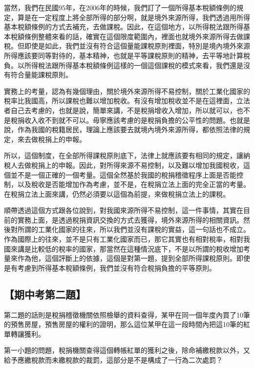 \documentclass[oneside,sub3section]{ctexbook}
\begin{document}
當然，我們在民國95年，在2006年的時候，我們訂了一個所得基本稅額條例的規定，算是在一定程度上將全部所得的部分啊，就是境外來源所得，我們透過用所得基本稅額條例的方式去補充，去做課稅。因此，在這個地方，以所得稅法跟所得基本稅額條例整體來看的話，確實在這個限度範圍內，裡面也就境外來源所得去做課稅。但即使是如此，我們並沒有符合這個量能課稅原則裡面，特別是境內境外來源所得應該要同等對待的，基本精神，也就是平等課稅原則的精神，去平等地計算稅負。以所得稅法跟所得基本稅額條例這樣的一個這個課稅的模式來看，我們還是沒有符合量能課稅原則。

實務上的考量，認為有幾個理由，關於境外來源所得不易控制，關於工業化國家的稅率比我國高，所以課稅也難以增加稅收。有沒有增加稅收並不是在這裡面，立法者自己去考慮的，也就是說，簡單來講，不是稅捐增收入增加，所以就可以，也不是稅捐收入收不到就不可以。毋寧應該考慮的是稅捐負擔的公平性的問題。也就是說，作為我國的稅籍居民，理論上應該要去就境內境外來源所得，都依照法律的規定，來去做稅捐上的申報。

所以，這個制度，在全部所得課稅原則底下，法律上就應該要有相同的規定，讓納稅人去做稅捐上的申報。因此，對所得來源不易控制，以及難以增加我國稅收，這個並不是一個正確的一個考量。這個全然基於我國的稅捐稽徵程序上面是否能控制，以及稅收是否能增加作為考慮，並不是，在稅捐立法上面的完全正當的考量。在稅捐立法上面來講，仍然必須要以這個為前提，來做稅捐立法上的課稅。

順帶透過這個方式跟各位說到，對我國來源所得不易控制，這一件事情，其實在目前的實務上面，是透過稅捐資訊交換的方式去獲得，境外來源所得的相關資訊。然後對所謂的工業化國家的往來，所以我們並沒有課稅的實益，這一句話也不成立。作為國際上的往來，並不是只有工業化國家而已，那它其實也有相對稅率，相對我國來講是比較低的稅率的國家，那當然在這種情況底下，不是以所謂的稅收增加考量來作為他，這個評斷上的依據，這個是對第一題，提到全部所得課稅原則。即使是有考慮到所得基本稅額條例，我們並沒有符合稅捐負擔的平等原則。

\hypertarget{ux671fux4e2dux8003ux7b2cux4e8cux984c}{%
\subsection{【期中考第二題】}\label{ux671fux4e2dux8003ux7b2cux4e8cux984c}}

第二題的話則是稅捐稽徵機關依照檢舉的資料查得，某甲在同一個年度內買了10筆的預售房屋，預售房屋的權利的證明，那么這位某甲在這一段時間內把這10筆的紅單轉讓獲利。

第一小題的問題，稅捐機關查得這個轉帳紅單的獲利之後，除命補繳稅款以外，又給予應繳稅款而未繳稅款的裁罰，這部分是不是構成了一行為二次處罰？
\end{document}
